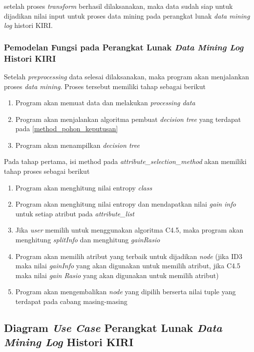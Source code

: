 setelah proses \textsl{transform} berhasil dilaksanakan, maka data sudah siap untuk dijadikan nilai input untuk proses data mining pada perangkat lunak \textsl{data mining log} histori KIRI.

\subsubsection{Pemodelan Fungsi pada Perangkat Lunak \textsl{Data Mining Log} Histori KIRI}
Setelah \textsl{preprocessing} data selesai dilaksanakan, maka program akan menjalankan proses \textsl{data mining}. Proses tersebut memiliki tahap sebagai berikut
\begin{enumerate}
	\item Program akan memuat data dan melakukan \textsl{processing data}
	\item Program akan menjalankan algoritma pembuat \textsl{decision tree} yang terdapat pada \ref{method_pohon_keputusan}
	\item Program akan menampilkan \textsl{decision tree}
\end{enumerate}  

Pada tahap pertama, isi method pada \textsl{attribute\_selection\_method} akan memiliki tahap proses sebagai berikut
\begin{enumerate}
	\item Program akan menghitung nilai entropy \textsl{class}
	\item Program akan menghitung nilai entropy dan mendapatkan nilai \textsl{gain info} untuk setiap atribut pada \textsl{attribute\_list}
	\item Jika \textsl{user} memilih untuk menggunakan algoritma C4.5, maka program akan menghitung \textsl{splitInfo} dan menghitung \textsl{gainRasio}
	\item Program akan memilih atribut yang terbaik untuk dijadikan \textsl{node} (jika ID3 maka nilai \textsl{gainInfo} yang akan digunakan untuk memilih atribut, jika C4.5 maka nilai \textsl{gain Rasio} yang akan digunakan untuk memilih atribut)
	\item Program akan mengembalikan \textsl{node} yang dipilih berserta nilai tuple yang terdapat pada cabang masing-masing
\end{enumerate}

\subsection{Diagram \textsl{Use Case} Perangkat Lunak \textsl{Data Mining Log} Histori KIRI}

